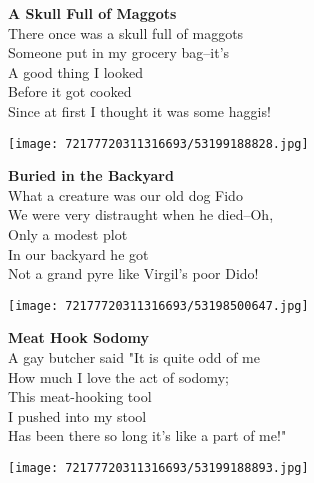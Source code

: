 \documentclass[10pt,letterpaper]{article}
\begin{document}
\begin{center}
\textbf{A Skull Full of Maggots}\\
\vskip 0.2in
There once was a skull full of maggots\\
Someone put in my grocery bag--it's\\
A good thing I looked\\
Before it got cooked\\
Since at first I thought it was some haggis!\\
\end{center}
\pagebreak

\begin{center}
\texttt{[image: 72177720311316693/53199188828.jpg]}
\end{center}

\begin{center}
\textbf{Buried in the Backyard}\\
\vskip 0.2in
What a creature was our old dog Fido\\
We were very distraught when he died--Oh,\\
Only a modest plot\\
In our backyard he got\\
Not a grand pyre like Virgil's poor Dido!\\
\end{center}
\pagebreak

\begin{center}
\texttt{[image: 72177720311316693/53198500647.jpg]}
\end{center}

\begin{center}
\textbf{Meat Hook Sodomy}\\
\vskip 0.2in
A gay butcher said "It is quite odd of me\\
How much I love the act of sodomy;\\
This meat-hooking tool\\
I pushed into my stool\\
Has been there so long it's like a part of me!"\\
\end{center}
\pagebreak

\begin{center}
\texttt{[image: 72177720311316693/53199188893.jpg]}
\end{center}
\end{document}
